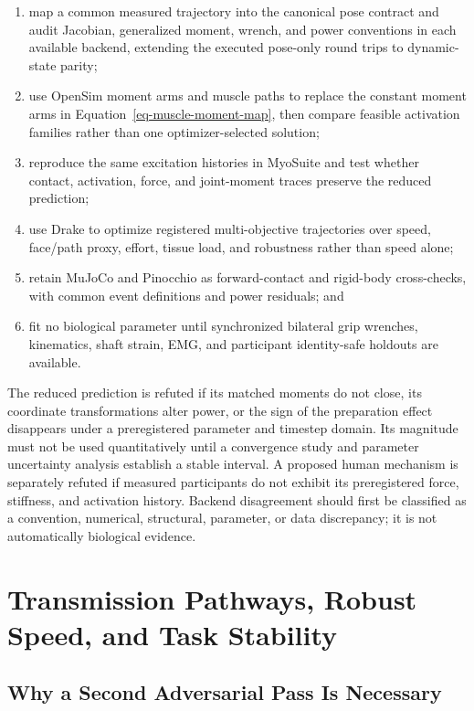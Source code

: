 \documentclass[
  letterpaper,
]{report}
\providecommand{\tightlist}{%
  \setlength{\itemsep}{0pt}\setlength{\parskip}{0pt}}
\begin{document}
\begin{enumerate}
\def\labelenumi{\arabic{enumi}.}
\tightlist
\item
  map a common measured trajectory into the canonical pose contract and
  audit Jacobian, generalized moment, wrench, and power conventions in
  each available backend, extending the executed pose-only round trips
  to dynamic-state parity;
\item
  use OpenSim moment arms and muscle paths to replace the constant
  moment arms in Equation~\ref{eq-muscle-moment-map}, then compare
  feasible activation families rather than one optimizer-selected
  solution;
\item
  reproduce the same excitation histories in MyoSuite and test whether
  contact, activation, force, and joint-moment traces preserve the
  reduced prediction;
\item
  use Drake to optimize registered multi-objective trajectories over
  speed, face/path proxy, effort, tissue load, and robustness rather
  than speed alone;
\item
  retain MuJoCo and Pinocchio as forward-contact and rigid-body
  cross-checks, with common event definitions and power residuals; and
\item
  fit no biological parameter until synchronized bilateral grip
  wrenches, kinematics, shaft strain, EMG, and participant identity-safe
  holdouts are available.
\end{enumerate}

The reduced prediction is refuted if its matched moments do not close,
its coordinate transformations alter power, or the sign of the
preparation effect disappears under a preregistered parameter and
timestep domain. Its magnitude must not be used quantitatively until a
convergence study and parameter uncertainty analysis establish a stable
interval. A proposed human mechanism is separately refuted if measured
participants do not exhibit its preregistered force, stiffness, and
activation history. Backend disagreement should first be classified as a
convention, numerical, structural, parameter, or data discrepancy; it is
not automatically biological evidence.

\chapter{Transmission Pathways, Robust Speed, and Task
Stability}\label{sec-transmission-robustness}

\section{Why a Second Adversarial Pass Is
Necessary}\label{why-a-second-adversarial-pass-is-necessary}
\end{document}
